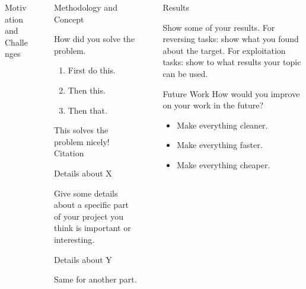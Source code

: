 \documentclass[final,dvipsnames]{beamer}
\newlength{\sepwidth}
\newlength{\colwidth}
\newcommand{\separatorcolumn}{\begin{column}{\sepwidth}\end{column}}
\begin{document}
\begin{frame}[t, fragile]
\begin{columns}[t]
\begin{column}{\colwidth}
\begin{block}{Motivation and Challenges}
	\end{block}


\end{column}

\separatorcolumn

\begin{column}{\colwidth}

	\begin{alertblock}{Methodology and Concept}

		How did you solve the problem.

		\begin{enumerate}
				\item First do this.
				\item Then this.
				\item Then that.
		\end{enumerate}

		This solves the problem nicely! Citation\cite{goli_resprop_2020}

	\end{alertblock}

	\begin{block}{Details about X}

		Give some details about a specific part of your project you think is
		important or interesting.

	\end{block}

	\begin{block}{Details about Y}

		Same for another part.

	\end{block}

\end{column}

\separatorcolumn

\begin{column}{\colwidth}

	\begin{block}{Results}

		Show some of your results. For reversing tasks: show what you found about
		the target. For exploitation tasks: show to what results your topic can be
		used.

	\end{block}

	\begin{exampleblock}{Future Work}
		How would you improve on your work in the future?
		\begin{itemize}
			\item Make everything cleaner.
			\item Make everything faster.
			\item Make everything cheaper.
		\end{itemize}
	\end{exampleblock}


\end{column}
\end{columns}
\end{frame}
\end{document}

